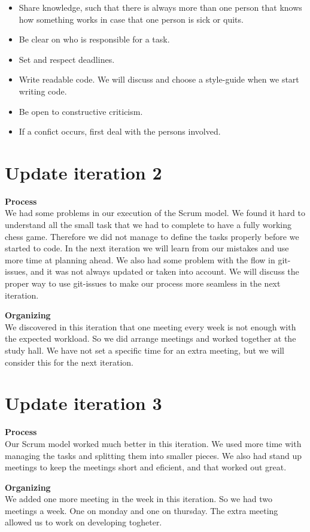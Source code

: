 \documentclass[norsk]{article}
\begin{document}
  \begin{itemize}
  	\item 
  	Share knowledge, such that there is always more than one person that knows how something works in case that one person is sick or quits.
  	\item 
  	Be clear on who is responsible for a task.
  	\item 
  	Set and respect deadlines.
  	\item 
  	Write readable code. We will discuss and choose a style-guide when we start writing code. 
  	\item 
  	Be open to constructive criticism.
  	\item
  	If a confict occurs, first deal with the persons involved. 
 \end{itemize}

\section{Update iteration 2}

\textbf{Process}\\
We had some problems in our execution of the Scrum model. We found it hard to understand all the small task that we had to complete to have a fully working chess game. Therefore we did not manage to define the tasks properly before we started to code. In the next iteration we will learn from our mistakes and use more time at planning ahead. We also had some problem with the flow in git-issues, and it was not always updated or taken into account. We will discuss the proper way to use git-issues to make our process more seamless in the next iteration.

\textbf{Organizing}\\
We discovered in this iteration that one meeting every week is not enough with the expected workload. So we did arrange meetings and worked together at the study hall. We have not set a specific time for an extra meeting, but we will consider this for the next iteration.

\section{Update iteration 3}
\textbf{Process}\\
Our Scrum model worked much better in this iteration. We used more time with managing the tasks and splitting them into smaller pieces. We also had stand up meetings to keep the meetings short and eficient, and that worked out great.

\textbf{Organizing}\\
We added one more meeting in the week in this iteration. So we had two meetings a week. One on monday and one on thursday. The extra meeting allowed us to work on developing togheter.

	
\end{document}
